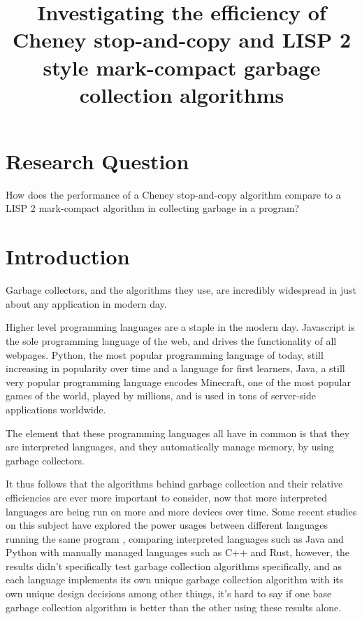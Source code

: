 \documentclass[index]{subfiles}
\begin{document}
\title{Investigating the efficiency of Cheney stop-and-copy and LISP 2 style mark-compact garbage collection algorithms}
\date{}
\author{}
\maketitle

\section{Research Question}

How does the performance of a Cheney stop-and-copy algorithm compare to a LISP 2 mark-compact algorithm in collecting garbage in a program? \cite{build_your_own_openjdk_gc}

\section{Introduction}

Garbage collectors, and the algorithms they use, are incredibly widespread in just about any application in modern day.

Higher level programming languages are a staple in the modern day. Javascript is the sole programming language of the web, and drives the functionality of all webpages. Python, the most popular programming language of today, still increasing in popularity over time and a language for first learners, Java, a still very popular programming language encodes Minecraft, one of the most popular games of the world, played by millions, and is used in tons of server-side applications worldwide.

The element that these programming languages all have in common is that they are interpreted languages, and they automatically manage memory, by using garbage collectors.

It thus follows that the algorithms behind garbage collection and their relative efficiencies are ever more important to consider, now that more interpreted languages are being run on more and more devices over time. Some recent studies on this subject have explored the power usages between different languages running the same program \cite{programming_languages_electricity}, comparing interpreted languages such as Java and Python with manually managed languages such as C++ and Rust, however, the results didn't specifically test garbage collection algorithms specifically, and as each language implements its own unique garbage collection algorithm with its own unique design decisions among other things, it's hard to say if one base garbage collection algorithm is better than the other using these results alone.
\end{document}
